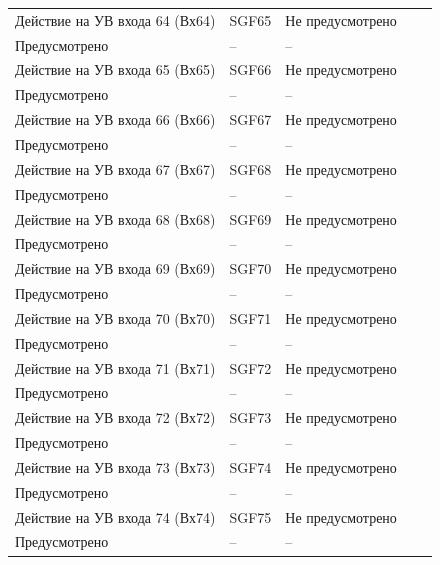 \begin{longtable}{|>{\centering\arraybackslash}m{5.3cm}|>{\centering\arraybackslash}m{3.3cm}|>{\centering\arraybackslash}m{4.2cm}|>{\centering\arraybackslash}m{1.8cm}|>{\centering\arraybackslash}m{1cm}|}
\hline
\centering Действие на УВ входа 64 (Вх64)  & \centering SGF65 & \centering Не предусмотрено \\ Предусмотрено & \centering -- & \centering \arraybackslash -- \\
\hline
\centering Действие на УВ входа 65 (Вх65)  & \centering SGF66 & \centering Не предусмотрено \\ Предусмотрено & \centering -- & \centering \arraybackslash -- \\
\hline
\centering Действие на УВ входа 66 (Вх66)  & \centering SGF67 & \centering Не предусмотрено \\ Предусмотрено & \centering -- & \centering \arraybackslash -- \\
\hline
\centering Действие на УВ входа 67 (Вх67)  & \centering SGF68 & \centering Не предусмотрено \\ Предусмотрено & \centering -- & \centering \arraybackslash -- \\
\hline
\centering Действие на УВ входа 68 (Вх68)  & \centering SGF69 & \centering Не предусмотрено \\ Предусмотрено & \centering -- & \centering \arraybackslash -- \\
\hline
\centering Действие на УВ входа 69 (Вх69)  & \centering SGF70 & \centering Не предусмотрено \\ Предусмотрено & \centering -- & \centering \arraybackslash -- \\
\hline
\centering Действие на УВ входа 70 (Вх70)  & \centering SGF71 & \centering Не предусмотрено \\ Предусмотрено & \centering -- & \centering \arraybackslash -- \\
\hline
\centering Действие на УВ входа 71 (Вх71)  & \centering SGF72 & \centering Не предусмотрено \\ Предусмотрено & \centering -- & \centering \arraybackslash -- \\
\hline
\centering Действие на УВ входа 72 (Вх72)  & \centering SGF73 & \centering Не предусмотрено \\ Предусмотрено & \centering -- & \centering \arraybackslash -- \\
\hline
\centering Действие на УВ входа 73 (Вх73)  & \centering SGF74 & \centering Не предусмотрено \\ Предусмотрено & \centering -- & \centering \arraybackslash -- \\
\hline
\centering Действие на УВ входа 74 (Вх74)  & \centering SGF75 & \centering Не предусмотрено \\ Предусмотрено & \centering -- & \centering \arraybackslash -- \\

\end{longtable}

